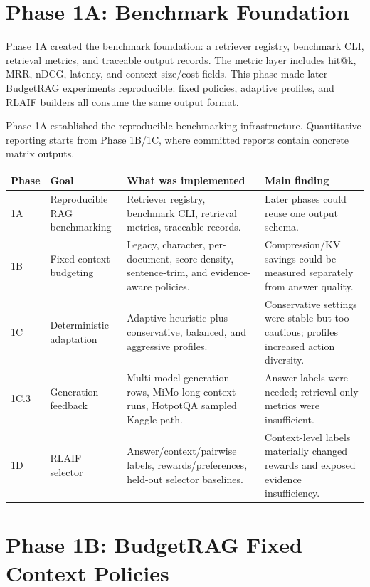 \section{Phase 1A: Benchmark Foundation}

Phase 1A created the benchmark foundation: a retriever registry, benchmark CLI, retrieval metrics, and traceable output records. The metric layer includes hit@k, MRR, nDCG, latency, and context size/cost fields. This phase made later BudgetRAG experiments reproducible: fixed policies, adaptive profiles, and RLAIF builders all consume the same output format.

Phase 1A established the reproducible benchmarking infrastructure. Quantitative reporting starts from Phase 1B/1C, where committed reports contain concrete matrix outputs.

\begin{center}
\small
\begin{tabular}{>{\raggedright\arraybackslash}p{1.4cm} >{\raggedright\arraybackslash}p{3.1cm} >{\raggedright\arraybackslash}p{4.7cm} >{\raggedright\arraybackslash}p{4.4cm}}
\toprule
Phase & Goal & What was implemented & Main finding \\
\midrule
1A & Reproducible RAG benchmarking & Retriever registry, benchmark CLI, retrieval metrics, traceable records. & Later phases could reuse one output schema. \\
1B & Fixed context budgeting & Legacy, character, per-document, score-density, sentence-trim, and evidence-aware policies. & Compression/KV savings could be measured separately from answer quality. \\
1C & Deterministic adaptation & Adaptive heuristic plus conservative, balanced, and aggressive profiles. & Conservative settings were stable but too cautious; profiles increased action diversity. \\
1C.3 & Generation feedback & Multi-model generation rows, MiMo long-context runs, HotpotQA sampled Kaggle path. & Answer labels were needed; retrieval-only metrics were insufficient. \\
1D & RLAIF selector & Answer/context/pairwise labels, rewards/preferences, held-out selector baselines. & Context-level labels materially changed rewards and exposed evidence insufficiency. \\
\bottomrule
\end{tabular}
\end{center}

\section{Phase 1B: BudgetRAG Fixed Context Policies}

